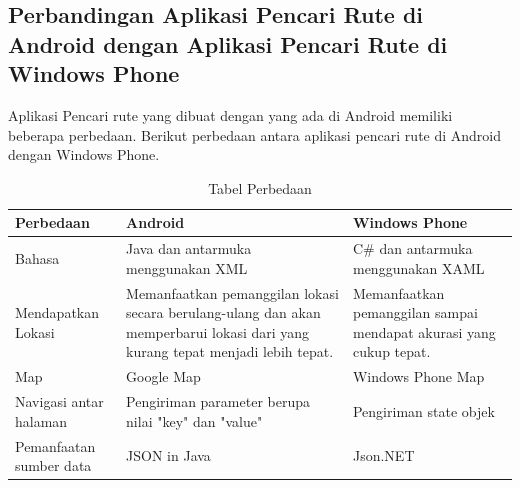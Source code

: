 \subsection{Perbandingan Aplikasi Pencari Rute di Android dengan Aplikasi Pencari Rute di Windows Phone}
\label{lab:Perbandingan}
\hspace{0.5cm} Aplikasi Pencari rute yang dibuat dengan yang ada di Android memiliki beberapa perbedaan. Berikut perbedaan antara aplikasi pencari rute di Android dengan Windows Phone.

\begin{table}[h]
	\centering
		\begin{tabular}{|p{4cm}|p{4cm}|p{4cm}|}\hline
				Perbedaan & Android & Windows Phone \\ \hline
				Bahasa & Java dan antarmuka menggunakan XML & C\# dan antarmuka menggunakan XAML \\ \hline
				Mendapatkan Lokasi & Memanfaatkan pemanggilan lokasi secara berulang-ulang dan akan memperbarui lokasi dari yang kurang tepat menjadi lebih tepat. & Memanfaatkan pemanggilan sampai mendapat akurasi yang cukup tepat. \\ \hline
				Map  & Google Map & Windows Phone Map \\ \hline
				Navigasi antar halaman  & Pengiriman parameter berupa nilai "key" dan "value" & Pengiriman state objek \\ \hline
				Pemanfaatan sumber data & JSON in Java & Json.NET \\ \hline
		\end{tabular}
	\caption{Tabel Perbedaan}
	\label{tab:TabelPerbedaan}
\end{table}    